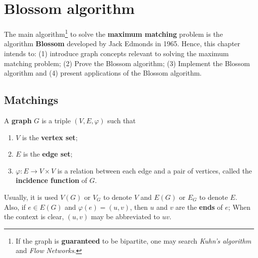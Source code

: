 \renewcommand*{\proofname}{Proof}

\chapter{Blossom algorithm}

The main algorithm\footnote{If the graph is \textbf{guaranteed} to be bipartite, one may search \textit{Kuhn's algorithm} and \textit{Flow Networks}.} to solve the \textbf{maximum matching} problem is the algorithm \textbf{Blossom} developed by Jack Edmonds in 1965.
Hence, this chapter intends to: 
(1) introduce graph concepts relevant to solving the maximum matching problem;
(2) Prove the Blossom algorithm; 
(3) Implement the Blossom algorithm and 
(4) present applications of the Blossom algorithm.

\enlargethispage{.5\baselineskip}

\section{Matchings}

\begin{definition}[Graph]
	\label{def:graph}
	A \textbf{graph} \(G\) is a triple \((V, E, \varphi)\) such that
	\begin{enumerate}[label=(\roman*)]
		\item \(V\) is the \textbf{vertex set};
		\item \(E\) is the \textbf{edge set};
		\item \(\varphi: E \to V \times V\) is a relation between each edge and a pair of vertices, called the \textbf{incidence function} of \(G\).
	\end{enumerate}
	Usually, it is used 
	\(V(G)\) or \(V_G\) to denote \(V\) and 
	\(E(G)\) or \(E_G\) to denote \(E\).
	Also, if \(e \in E(G)\) and \(\varphi(e) = (u, v)\), then \(u\) and \(v\) are the \textbf{ends} of \(e\);
	When the context is clear, \((u, v)\) may be abbreviated to \(uv\).

\end{definition}

